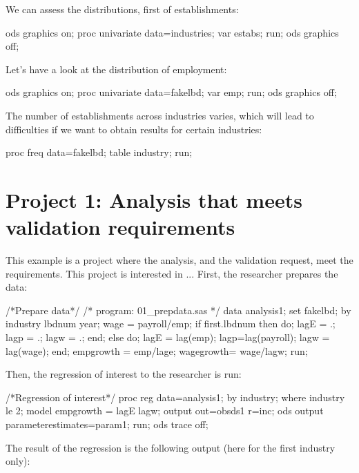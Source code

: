\documentclass{article}
\begin{document}
We can assess the distributions, first of establishments:

\begin{Sascode}[store=univarA,program]
ods graphics on;
  proc univariate data=industries;
  var estabs;
  run;
  ods graphics off;
 \end{Sascode}

Let's have a look at the distribution of employment:

\begin{Sascode}[store=univarB,program]
ods graphics on;
proc univariate data=fakelbd;
var emp;
run;
ods graphics off;
\end{Sascode}

The number of establishments across industries varies, which will lead to difficulties if we want to obtain results for certain industries:

\begin{Sascode}[store=obsperind,program]
proc freq data=fakelbd;
table industry;
run;
\end{Sascode}

\section{Project 1:  Analysis that meets validation requirements}
This example is a project where the analysis, and the validation request, meet the requirements. This project is interested in ... First, the researcher prepares the data:

\begin{Datastep}
/*Prepare data*/
/* program: 01_prepdata.sas */
data analysis1;
set fakelbd;
by industry lbdnum year;
wage = payroll/emp;
if first.lbdnum then do; 
	lagE = .;         
	lagp = .;         
	lagw = .;         
end;
else                 do; 
	lagE = lag(emp); 
	lagp=lag(payroll); 
	lagw = lag(wage); 
end;
empgrowth = emp/lage;
wagegrowth= wage/lagw;
run;
\end{Datastep}

Then, the regression of interest to the researcher is run:

\begin{Sascode}[store=regA]
/*Regression of interest*/
proc reg data=analysis1;
by industry;
where industry le 2;
model empgrowth = lagE lagw;
output out=obsds1 r=inc;
ods output parameterestimates=param1;
run;
ods trace off;
\end{Sascode}
The result of the regression is the following output (here for the first industry only):
\end{document}
